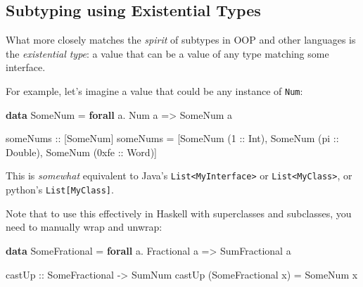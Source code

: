 \documentclass[]{article}
\newenvironment{Shaded}{}{}
\newcommand{\BaseNTok}[1]{\textcolor[rgb]{0.25,0.63,0.44}{#1}}
\newcommand{\DataTypeTok}[1]{\textcolor[rgb]{0.56,0.13,0.00}{#1}}
\newcommand{\DecValTok}[1]{\textcolor[rgb]{0.25,0.63,0.44}{#1}}
\newcommand{\FunctionTok}[1]{\textcolor[rgb]{0.02,0.16,0.49}{#1}}
\newcommand{\KeywordTok}[1]{\textcolor[rgb]{0.00,0.44,0.13}{\textbf{#1}}}
\newcommand{\NormalTok}[1]{#1}
\newcommand{\OperatorTok}[1]{\textcolor[rgb]{0.40,0.40,0.40}{#1}}
\newcommand{\OtherTok}[1]{\textcolor[rgb]{0.00,0.44,0.13}{#1}}
\begin{document}
\subsection{Subtyping using Existential
Types}\label{subtyping-using-existential-types}

What more closely matches the \emph{spirit} of subtypes in OOP and other
languages is the \emph{existential type}: a value that can be a value of any
type matching some interface.

For example, let's imagine a value that could be any instance of \texttt{Num}:

\begin{Shaded}
\begin{Highlighting}[]
\KeywordTok{data} \DataTypeTok{SomeNum} \OtherTok{=} \KeywordTok{forall}\NormalTok{ a}\OperatorTok{.} \DataTypeTok{Num}\NormalTok{ a }\OtherTok{=\textgreater{}} \DataTypeTok{SomeNum}\NormalTok{ a}

\OtherTok{someNums ::}\NormalTok{ [}\DataTypeTok{SomeNum}\NormalTok{]}
\NormalTok{someNums }\OtherTok{=}\NormalTok{ [}\DataTypeTok{SomeNum}\NormalTok{ (}\DecValTok{1}\OtherTok{ ::} \DataTypeTok{Int}\NormalTok{), }\DataTypeTok{SomeNum}\NormalTok{ (}\FunctionTok{pi}\OtherTok{ ::} \DataTypeTok{Double}\NormalTok{), }\DataTypeTok{SomeNum}\NormalTok{ (}\BaseNTok{0xfe}\OtherTok{ ::} \DataTypeTok{Word}\NormalTok{)]}
\end{Highlighting}
\end{Shaded}

This is \emph{somewhat} equivalent to Java's
\texttt{List\textless{}MyInterface\textgreater{}} or
\texttt{List\textless{}MyClass\textgreater{}}, or python's
\texttt{List{[}MyClass{]}}.

Note that to use this effectively in Haskell with superclasses and subclasses,
you need to manually wrap and unwrap:

\begin{Shaded}
\begin{Highlighting}[]
\KeywordTok{data} \DataTypeTok{SomeFrational} \OtherTok{=} \KeywordTok{forall}\NormalTok{ a}\OperatorTok{.} \DataTypeTok{Fractional}\NormalTok{ a }\OtherTok{=\textgreater{}} \DataTypeTok{SumFractional}\NormalTok{ a}

\OtherTok{castUp ::} \DataTypeTok{SomeFractional} \OtherTok{{-}\textgreater{}} \DataTypeTok{SumNum}
\NormalTok{castUp (}\DataTypeTok{SomeFractional}\NormalTok{ x) }\OtherTok{=} \DataTypeTok{SomeNum}\NormalTok{ x}
\end{Highlighting}
\end{Shaded}
\end{document}
